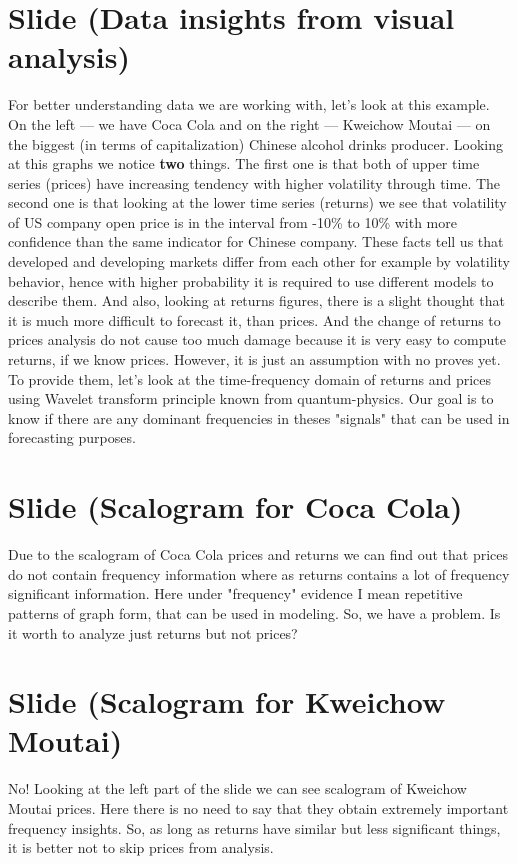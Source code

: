 \documentclass[a4paper, 12pt]{article}
\begin{document}
	\section{Slide (Data insights from visual analysis)}
		For better understanding data we are working with, let's look at this example. On the left --- we have Coca Cola and on the right --- Kweichow Moutai --- on the biggest (in terms of capitalization) Chinese alcohol drinks producer. Looking at this graphs we notice \textbf{two} things. The first one is that both of upper time series (prices) have increasing tendency with higher volatility through time. The second one is that looking at the lower time series (returns) we see that volatility of US company open price is in the interval from -10\% to 10\%  with more confidence than the same indicator for Chinese company. These facts tell us that developed and developing markets differ from each other for example by volatility behavior, hence with higher probability it is required to use different models to describe them. And also, looking at returns figures, there is a slight thought that it is much more difficult to forecast it, than prices. And the change of returns to prices analysis do not cause too much damage because it is very easy to compute returns, if we know prices. However, it is just an assumption with no proves yet. To provide them, let's look at the time-frequency domain of returns and prices using Wavelet transform principle known from quantum-physics. Our goal is to know if there are any dominant frequencies in theses "signals" that can be used in forecasting purposes.
	\section{Slide (Scalogram for Coca Cola)}
		Due to the scalogram of Coca Cola prices and returns we can find out that prices do not contain frequency information where as returns contains a lot of frequency significant information. Here under "frequency" evidence I mean repetitive patterns of graph form, that can be used in modeling. So, we have a problem. Is it worth to analyze just returns but not prices?
	\section{Slide (Scalogram for Kweichow Moutai)}
		No! Looking at the left part of the slide we can see scalogram of Kweichow Moutai prices. Here there is no need to say that they obtain extremely important frequency insights. So, as long as returns have similar but less significant things, it is better not to skip prices from analysis. 
\end{document}
